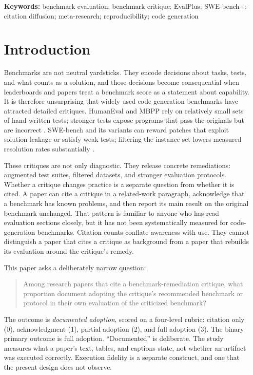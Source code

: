 \documentclass[11pt,a4paper]{article}
\begin{document}
\vspace{0.6em}
\noindent\textbf{Keywords:} benchmark evaluation; benchmark critique; EvalPlus; SWE-bench+; citation diffusion; meta-research; reproducibility; code generation

\vspace{1.1em}
\noindent{\color{rule}\rule{\textwidth}{0.4pt}}

\section{Introduction}

Benchmarks are not neutral yardsticks. They encode decisions about tasks, tests, and what counts as a solution, and those decisions become consequential when leaderboards and papers treat a benchmark score as a statement about capability. It is therefore unsurprising that widely used code-generation benchmarks have attracted detailed critiques. HumanEval and MBPP rely on relatively small sets of hand-written tests; stronger tests expose programs that pass the originals but are incorrect \citep{liu2023}. SWE-bench and its variants can reward patches that exploit solution leakage or satisfy weak tests; filtering the instance set lowers measured resolution rates substantially \citep{aleithan2024}.

These critiques are not only diagnostic. They release concrete remediations: augmented test suites, filtered datasets, and stronger evaluation protocols. Whether a critique changes practice is a separate question from whether it is cited. A paper can cite a critique in a related-work paragraph, acknowledge that a benchmark has known problems, and then report its main result on the original benchmark unchanged. That pattern is familiar to anyone who has read evaluation sections closely, but it has not been systematically measured for code-generation benchmarks. Citation counts conflate awareness with use. They cannot distinguish a paper that cites a critique as background from a paper that rebuilds its evaluation around the critique's remedy.

This paper asks a deliberately narrow question:
\begin{quote}
Among research papers that cite a benchmark-remediation critique, what proportion document adopting the critique's recommended benchmark or protocol in their own evaluation of the criticized benchmark?
\end{quote}

The outcome is \emph{documented adoption}, scored on a four-level rubric: citation only (0), acknowledgment (1), partial adoption (2), and full adoption (3). The binary primary outcome is full adoption. ``Documented'' is deliberate. The study measures what a paper's text, tables, and captions state, not whether an artifact was executed correctly. Execution fidelity is a separate construct, and one that the present design does not observe.
\end{document}
